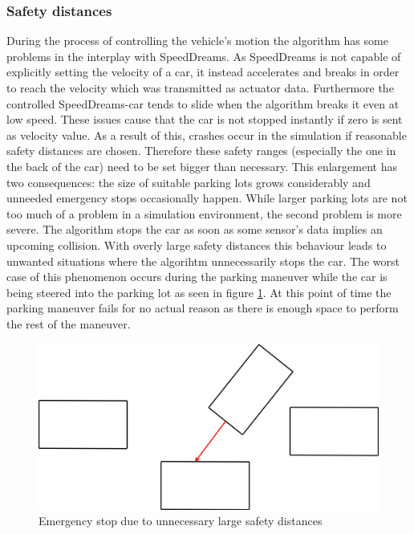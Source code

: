 \documentclass[paper=a4, fontsize=11pt]{scrreprt}
\begin{document}
\subsubsection{Safety distances} \label{distances}
During the process of controlling the vehicle's motion the algorithm has some problems in the interplay with SpeedDreams. As SpeedDreams is not capable of explicitly setting the velocity of a car, it instead accelerates and breaks in order to reach the velocity which was transmitted as actuator data. Furthermore the controlled SpeedDreams-car tends to slide when the algorithm breaks it even at low speed. These issues cause that the car is not stopped instantly if zero is sent as velocity value. As a result of this, crashes occur in the simulation if reasonable safety distances are chosen. Therefore these safety ranges (especially the one in the back of the car) need to be set bigger than necessary. This enlargement has two consequences: the size of suitable parking lots grows considerably and unneeded emergency stops occasionally happen. While larger parking lots are not too much of a problem in a simulation environment, the second problem is more severe. The algorithm stops the car as soon as some sensor's data implies an upcoming collision. With overly large safety distances this behaviour leads to unwanted situations where the algorihtm unnecessarily stops the car. The worst case of this phenomenon occurs during the parking maneuver while the car is being steered into the parking lot as seen in figure \ref{false_emergency}. At this point of time the parking maneuver fails for no actual reason as there is enough space to perform the rest of the maneuver.
\begin{figure}[H]
\centering
\includegraphics[scale=0.35]{images_ecu/emergency_stop.png}
\caption{\tiny Emergency stop due to unnecessary large safety distances}
\label{false_emergency}
\end{figure}
\end{document}
